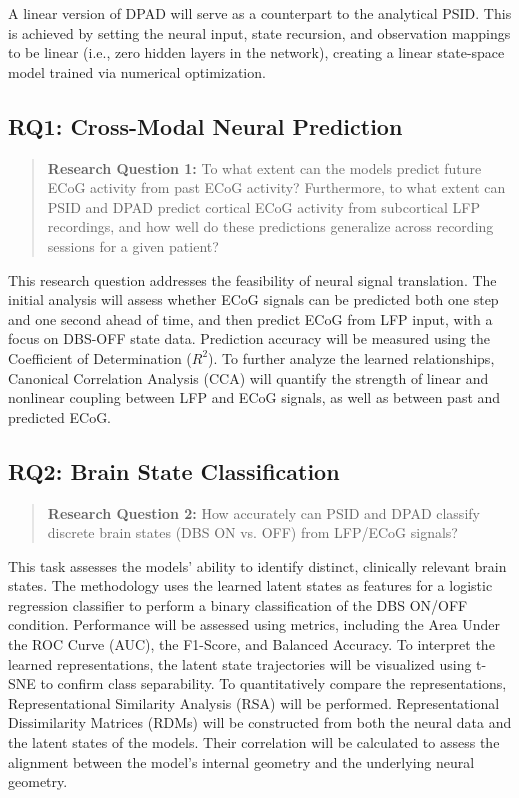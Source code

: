 \documentclass[12pt, letterpaper]{article}
\begin{document}
A linear version of DPAD will serve as a counterpart to the analytical PSID. This is achieved by setting the neural input, state recursion, and observation mappings to be linear (i.e., zero hidden layers in the network), creating a linear state-space model trained via numerical optimization.

\subsection{RQ1: Cross-Modal Neural Prediction}

\begin{quote}

    \textbf{Research Question 1:} To what extent can the models predict future ECoG activity from past ECoG activity? Furthermore, to what extent can PSID and DPAD predict cortical ECoG activity from subcortical LFP recordings, and how well do these predictions generalize across recording sessions for a given patient?

\end{quote}

This research question addresses the feasibility of neural signal translation. The initial analysis will assess whether ECoG signals can be predicted both one step and one second ahead of time, and then predict ECoG from LFP input, with a focus on DBS-OFF state data. Prediction accuracy will be measured using the Coefficient of Determination ($R^2$). To further analyze the learned relationships, Canonical Correlation Analysis (CCA) will quantify the strength of linear and nonlinear coupling between LFP and ECoG signals, as well as between past and predicted ECoG.

\subsection{RQ2: Brain State Classification}

\begin{quote}

    \textbf{Research Question 2:} How accurately can PSID and DPAD classify discrete brain states (DBS ON vs. OFF) from LFP/ECoG signals?

\end{quote}

This task assesses the models' ability to identify distinct, clinically relevant brain states. The methodology uses the learned latent states as features for a logistic regression classifier to perform a binary classification of the DBS ON/OFF condition. Performance will be assessed using metrics, including the Area Under the ROC Curve (AUC), the F1-Score, and Balanced Accuracy. To interpret the learned representations, the latent state trajectories will be visualized using t-SNE to confirm class separability. To quantitatively compare the representations, Representational Similarity Analysis (RSA) will be performed. Representational Dissimilarity Matrices (RDMs) will be constructed from both the neural data and the latent states of the models. Their correlation will be calculated to assess the alignment between the model's internal geometry and the underlying neural geometry.
\end{document}
